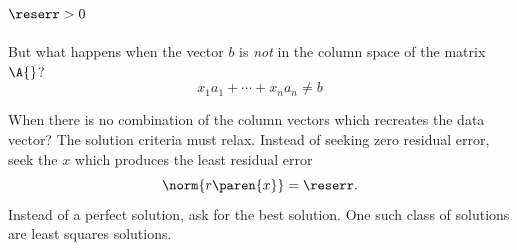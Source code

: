 \subsection{$\reserr > 0$}  
But what happens when the vector $b$ is \emph{not} in the column space of the matrix $\A{}$? 
%
\begin{equation}
	x_{1} a_{1} + \cdots + x_{n} a_{n} \ne b
\label{eq:inconsistent}
\end{equation}
%


When there is no combination of the column vectors which recreates the data vector? The solution criteria must relax. Instead of seeking zero residual error, seek the $x$ which produces the least residual error
%
\begin{equation*}
	\norm{r\paren{x}} = \reserr.
\end{equation*}
%
Instead of a perfect solution, ask for the best solution. One such class of solutions are least squares solutions.

